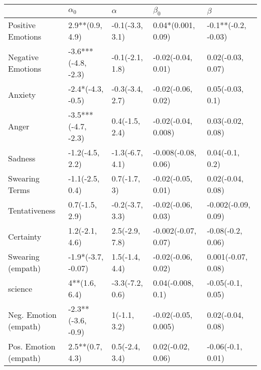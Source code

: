 \begin{tabular}{lllll}
\toprule
{} &           $\alpha_0$ &         $\alpha$ &            $\beta_0$ &              $\beta$ \\
\midrule
Positive Emotions     &      2.9**(0.9, 4.9) &  -0.1(-3.3, 3.1) &   0.04*(0.001, 0.09) &  -0.1**(-0.2, -0.03) \\
Negative Emotions     &  -3.6***(-4.8, -2.3) &  -0.1(-2.1, 1.8) &   -0.02(-0.04, 0.01) &    0.02(-0.03, 0.07) \\
Anxiety               &    -2.4*(-4.3, -0.5) &  -0.3(-3.4, 2.7) &   -0.02(-0.06, 0.02) &     0.05(-0.03, 0.1) \\
Anger                 &  -3.5***(-4.7, -2.3) &   0.4(-1.5, 2.4) &  -0.02(-0.04, 0.008) &    0.03(-0.02, 0.08) \\
Sadness               &      -1.2(-4.5, 2.2) &  -1.3(-6.7, 4.1) &  -0.008(-0.08, 0.06) &      0.04(-0.1, 0.2) \\
Swearing Terms        &      -1.1(-2.5, 0.4) &     0.7(-1.7, 3) &   -0.02(-0.05, 0.01) &    0.02(-0.04, 0.08) \\
Tentativeness         &       0.7(-1.5, 2.9) &  -0.2(-3.7, 3.3) &   -0.02(-0.06, 0.03) &  -0.002(-0.09, 0.09) \\
Certainty             &       1.2(-2.1, 4.6) &   2.5(-2.9, 7.8) &  -0.002(-0.07, 0.07) &    -0.08(-0.2, 0.06) \\
Swearing (empath)     &   -1.9*(-3.7, -0.07) &   1.5(-1.4, 4.4) &   -0.02(-0.06, 0.02) &   0.001(-0.07, 0.08) \\
science               &        4**(1.6, 6.4) &  -3.3(-7.2, 0.6) &    0.04(-0.008, 0.1) &    -0.05(-0.1, 0.05) \\
Neg. Emotion (empath) &   -2.3**(-3.6, -0.9) &     1(-1.1, 3.2) &  -0.02(-0.05, 0.005) &    0.02(-0.04, 0.08) \\
Pos. Emotion (empath) &      2.5**(0.7, 4.3) &   0.5(-2.4, 3.4) &    0.02(-0.02, 0.06) &    -0.06(-0.1, 0.01) \\
\bottomrule
\end{tabular}
